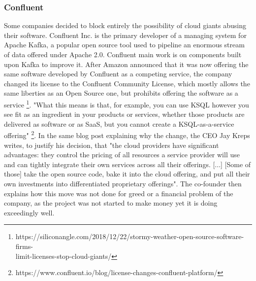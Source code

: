 \documentclass[12pt, a4paper]{article}
\begin{document}
  \pagebreak
  \subsubsection{Confluent}
  Some companies decided to block entirely the possibility of cloud giants abusing their software. Confluent Inc. is the primary developer of a managing system for Apache Kafka, a popular open source tool used to pipeline an enormous stream of data offered under Apache 2.0. Confluent main work is on components built upon Kafka to improve it. After Amazon announced that it was now offering the same software developed by Confluent as a competing service, the company changed its license to the Confluent Community License, which mostly allows the same liberties as an Open Source one, but prohibits offering the software as a service 
  \footnote{https://siliconangle.com/2018/12/22/stormy-weather-open-source-software-firms-\\limit-licenses-stop-cloud-giants/}.
  "What this means is that, for example, you can use KSQL however you see fit as an ingredient in your products or services, whether those products are delivered as software or as SaaS, but you cannot create a KSQL-as-a-service offering" \footnote{https://www.confluent.io/blog/license-changes-confluent-platform/}. In the same blog post explaining why the change, the CEO Jay Kreps writes, to justify his decision, that "the cloud providers have significant advantages: they control the pricing of all resources a service provider will use and can tightly integrate their own services across all their offerings. [...] [Some of those] take the open source code, bake it into the cloud offering, and put all their own investments into differentiated proprietary offerings". The co-founder then explains how this move was not done for greed or a financial problem of the company, as the project was not started to make money yet it is doing exceedingly well.
\end{document}
